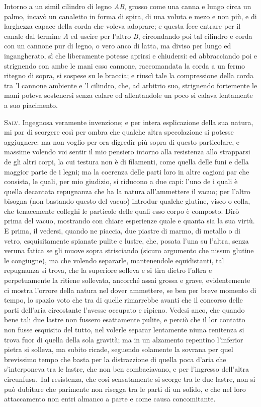 \documentclass[11pt,twoside,openany]{book}
\newcommand{\speaker}[1]{\textcolor{rubric}{\textsc{#1}}\space}
\begin{document}
Intorno a un simil cilindro di legno \emph{AB}, grosso come una canna e lungo circa un palmo, incavò un canaletto in forma di spira, di una voluta e mezo e non più, e di larghezza capace della corda che voleva adoprare; e questa fece entrare per il canale dal termine \emph{A} ed uscire per l'altro \emph{B}, circondando poi tal cilindro e corda con un cannone pur di legno, o vero anco di latta, ma diviso per lungo ed ingangherato, sì che liberamente potesse aprirsi e chiudersi: ed abbracciando poi e strignendo con ambe le mani esso cannone, raccomandata la corda a un fermo ritegno di sopra, si sospese su le braccia; e riuscì tale la compressione della corda tra 'l cannone ambiente e 'l cilindro, che, ad arbitrio suo, strignendo fortemente le mani poteva sostenersi senza calare ed allentandole un poco si calava lentamente a suo piacimento.

\speaker{Salv.} Ingegnosa veramente invenzione; e per intera esplicazione della sua natura, mi par di scorgere così per ombra che qualche altra specolazione si potesse aggiugnere: ma non voglio per ora digredir più sopra di questo particolare, e massime volendo voi sentir il mio pensiero intorno alla resistenza allo strapparsi de gli altri corpi, la cui testura non è di filamenti, come quella delle funi e della maggior parte de i legni; ma la coerenza delle parti loro in altre cagioni par che consista, le quali, per mio giudizio, si riducono a due capi: l'uno de i quali è quella decantata repugnanza che ha la natura all'ammettere il vacuo; per l'altro bisogna (non bastando questo del vacuo) introdur qualche glutine, visco o colla, che tenacemente colleghi le particole delle quali esso corpo è composto. Dirò prima del vacuo, mostrando con chiare esperienze quale e quanta sia la sua virtù. E prima, il vedersi, quando ne piaccia, due piastre di marmo, di metallo o di vetro, esquisitamente spianate pulite e lustre, che, posata l'una su l'altra, senza veruna fatica se gli muove sopra strisciando (sicuro argumento che nissun glutine le congiugne), ma che volendo separarle, mantenendole equidistanti, tal repugnanza si trova, che la superiore solleva e si tira dietro l'altra e perpetuamente la ritiene sollevata, ancorché assai grossa e grave, evidentemente ci mostra l'orrore della natura nel dover ammettere, se ben per breve momento di tempo, lo spazio voto che tra di quelle rimarrebbe avanti che il concorso delle parti dell'aria circostante l'avesse occupato e ripieno. Vedesi anco, che quando bene tali due lastre non fussero esattamente pulite, e perciò che il lor contatto non fusse esquisito del tutto, nel volerle separar lentamente niuna renitenza si trova fuor di quella della sola gravità; ma in un alzamento repentino l'inferior pietra si solleva, ma subito ricade, seguendo solamente la sovrana per quel brevissimo tempo che basta per la distrazzione di quella poca d'aria che s'interponeva tra le lastre, che non ben combaciavano, e per l'ingresso dell'altra circunfusa. Tal resistenza, che così sensatamente si scorge tra le due lastre, non si può dubitare che parimente non risegga tra le parti di un solido, e che nel loro attaccamento non entri almanco a parte e come causa concomitante.
\end{document}
